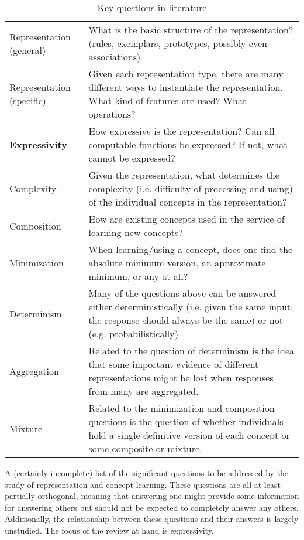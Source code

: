 \documentclass[doc,floatsintext]{apa6}
\begin{document}
\begin{table}
\centering
\begin{tabular}{ | p{3cm} | p{13cm} |}
    \hline
    Representation (general) & What is the basic structure of the representation? (rules, exemplars, prototypes, possibly even associations) \\
    Representation (specific) & Given each representation type, there are many different ways to instantiate the representation. What kind of features are used? What operations? \\
    \textbf{Expressivity} & How expressive is the representation? Can all computable functions be expressed? If not, what cannot be expressed? \\
    Complexity & Given the representation, what determines the complexity (i.e. difficulty of processing and using) of the individual concepts in the representation? \\
    Composition & How are existing concepts used in the service of learning new concepts? \\
    Minimization & When learning/using a concept, does one find the absolute minimum version, an approximate minimum, or any at all? \\
    Determinism & Many of the questions above can be answered either deterministically (i.e. given the same input, the response should always be the same) or not (e.g. probabilistically) \\
    Aggregation & Related to the question of determinism is the idea that some important evidence of different representations might be lost when responses from many are aggregated. \\
    Mixture & Related to the minimization and composition questions is the question of whether individuals hold a single definitive version of each concept or some composite or mixture. \\
    \hline
  \end{tabular}
\caption{Key questions in literature}
\begin{tablenotes}
{\small
A (certainly incomplete) list of the significant questions to be addressed by the study of representation and concept learning. These questions are all at least partially orthogonal, meaning that answering one might provide some information for answering others but should not be expected to completely answer any others. Additionally, the relationship between these questions and their answers is largely unstudied. The focus of the review at hand is expressivity.
}
\end{tablenotes} \label{tbl:questions}
\end{table}
\end{document}
